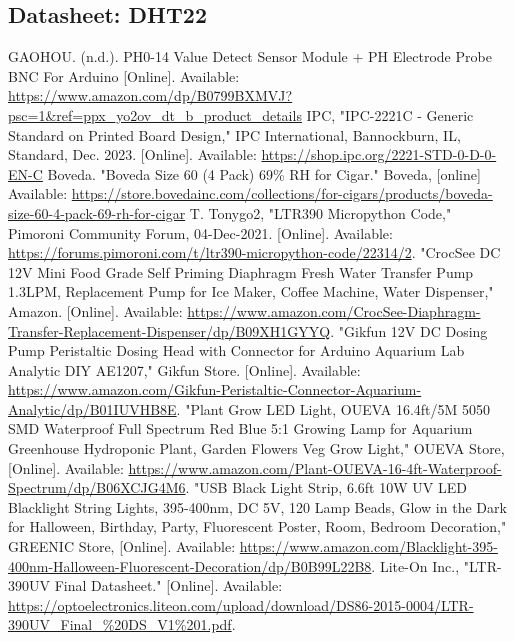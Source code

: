 \documentclass[12pt]{article} %
\begin{document}
\subsection{Datasheet: DHT22}
\label{appendix:dht22}

\pagebreak
\begin{thebibliography}{99}
     GAOHOU. (n.d.). PH0-14 Value Detect Sensor Module + PH Electrode Probe BNC For Arduino [Online]. Available: \url{https://www.amazon.com/dp/B0799BXMVJ?psc=1&ref=ppx_yo2ov_dt_b_product_details}
     IPC, "IPC-2221C - Generic Standard on Printed Board Design," IPC International, Bannockburn, IL, Standard, Dec. 2023. [Online]. Available: \url{https://shop.ipc.org/2221-STD-0-D-0-EN-C}
     Boveda. "Boveda Size 60 (4 Pack) 69\% RH for Cigar." Boveda, [online] Available: \url{https://store.bovedainc.com/collections/for-cigars/products/boveda-size-60-4-pack-69-rh-for-cigar} 
     T. Tonygo2, "LTR390 Micropython Code," Pimoroni Community Forum, 04-Dec-2021. [Online]. Available: \url{https://forums.pimoroni.com/t/ltr390-micropython-code/22314/2}.
     "CrocSee DC 12V Mini Food Grade Self Priming Diaphragm Fresh Water Transfer Pump 1.3LPM, Replacement Pump for Ice Maker, Coffee Machine, Water Dispenser," Amazon. [Online]. Available: \url{https://www.amazon.com/CrocSee-Diaphragm-Transfer-Replacement-Dispenser/dp/B09XH1GYYQ}. 
     "Gikfun 12V DC Dosing Pump Peristaltic Dosing Head with Connector for Arduino Aquarium Lab Analytic DIY AE1207," Gikfun Store. [Online]. Available: \url{https://www.amazon.com/Gikfun-Peristaltic-Connector-Aquarium-Analytic/dp/B01IUVHB8E}. 
     "Plant Grow LED Light, OUEVA 16.4ft/5M 5050 SMD Waterproof Full Spectrum Red Blue 5:1 Growing Lamp for Aquarium Greenhouse Hydroponic Plant, Garden Flowers Veg Grow Light," OUEVA Store, [Online]. Available: \url{https://www.amazon.com/Plant-OUEVA-16-4ft-Waterproof-Spectrum/dp/B06XCJG4M6}.
     "USB Black Light Strip, 6.6ft 10W UV LED Blacklight String Lights, 395-400nm, DC 5V, 120 Lamp Beads, Glow in the Dark for Halloween, Birthday, Party, Fluorescent Poster, Room, Bedroom Decoration," GREENIC Store, [Online]. Available: \url{https://www.amazon.com/Blacklight-395-400nm-Halloween-Fluorescent-Decoration/dp/B0B99L22B8}.
     Lite-On Inc., "LTR-390UV Final Datasheet." [Online]. Available: \url{https://optoelectronics.liteon.com/upload/download/DS86-2015-0004/LTR-390UV_Final_%20DS_V1%201.pdf}.

\end{thebibliography}
\end{document}
